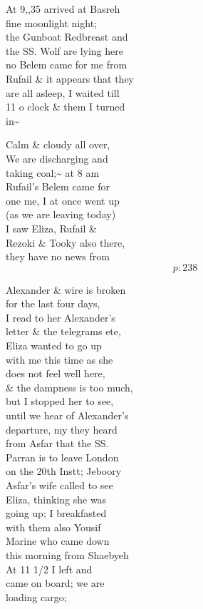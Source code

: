\documentclass{report}
\begin{document}
	\par{
 	At 9,,35 arrived at Basreh\ \\fine moonlight night;\ \\the Gunboat Redbreast and\ \\the SS. Wolf are lying here\ \\no Belem came for me from\ \\Rufail \& it appears that they\ \\are all asleep, I waited till\ \\11 o clock \& them I turned\ \\in\~{}\ \\
	}

	\par{
 	Calm \& cloudy all over,\ \\We are discharging and\ \\taking coal;\~{} at 8 am\ \\Rufail’s Belem came for\ \\one me, I at once went up\ \\(as we are leaving today)\ \\I saw Eliza, Rufail \&\ \\Rezoki \& Tooky also there,\ \\they have no news from\ \\
  \[p: 238 \]

	}

	\par{
 	Alexander \& wire is broken\ \\for the last four days,\ \\I read to her Alexander's\ \\letter \& the telegrams ete,\ \\Eliza wanted to go up\ \\with me this time as she\ \\does not feel well here,\ \\\& the dampness is too much,\ \\but I stopped her to see,\ \\until we hear of Alexander's\ \\departure, my they heard\ \\from Asfar that the SS.\ \\Parran is to leave London\ \\on the 20th Instt; Jeboory\ \\Asfar’s wife called to see\ \\Eliza, thinking she was\ \\going up; I breakfasted\ \\with them also Yousif\ \\Marine who came down\ \\this morning from Shaebyeh\ \\At 11 1/2 I left and\ \\came on board; we are\ \\loading cargo;\ \\
	}
\end{document}
